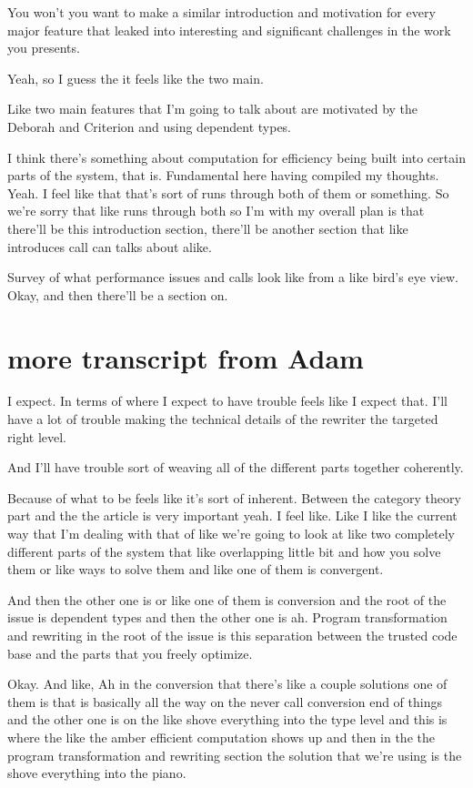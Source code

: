 \begin{subappendices}
You won't you want to make a similar introduction and motivation for every major feature that leaked into interesting and significant challenges in the work you presents. 

Yeah, so I guess the it feels like the two main. 

Like two main features that I'm going to talk about are motivated by the Deborah and Criterion and using dependent types. 

I think there's something about computation for efficiency being built into certain parts of the system, that is. Fundamental here having compiled my thoughts. Yeah. I feel like that that's sort of runs through both of them or something. So we're sorry that like runs through both so I'm with my overall plan is that there'll be this introduction section, there'll be another section that like introduces call can talks about alike. 

Survey of what performance issues and calls look like from a like bird's eye view. Okay, and then there'll be a section on. 

\section{more transcript from Adam}
I expect. In terms of where I expect to have trouble feels like I expect that. I'll have a lot of trouble making the technical details of the rewriter the targeted right level. 

And I'll have trouble sort of weaving all of the different parts together coherently. 

Because of what to be feels like it's sort of inherent. Between the category theory part and the the article is very important yeah. I feel like. Like I like the current way that I'm dealing with that of like we're going to look at like two completely different parts of the system that like overlapping little bit and how you solve them or like ways to solve them and like one of them is convergent. 

And then the other one is or like one of them is conversion and the root of the issue is dependent types and then the other one is ah. Program transformation and rewriting in the root of the issue is this separation between the trusted code base and the parts that you freely optimize. 

Okay. And like, Ah in the conversion that there's like a couple solutions one of them is that is basically all the way on the never call conversion end of things and the other one is on the like shove everything into the type level and this is where the like the amber efficient computation shows up and then in the the program transformation and rewriting section the solution that we're using is the shove everything into the piano. 


\end{subappendices}
